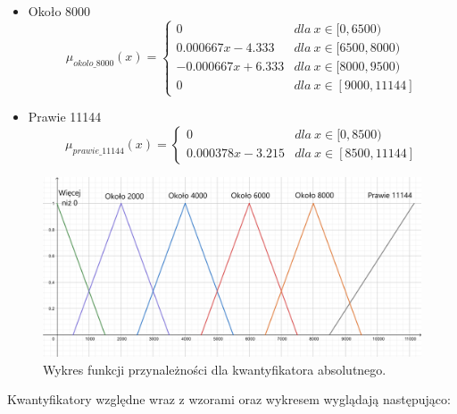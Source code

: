 \documentclass{classrep}
\begin{document}
\begin{itemize}
\begin{equation}
        \end{equation}
        \item Około 8000
        \begin{equation}
            \mu_{okolo\_8000}(x) = \left\{\begin{matrix} 0 & dla \: x\in [0, 6500) \\ 0.000667x - 4.333 & dla \: x\in[6500, 8000) \\ -0.000667x + 6.333 & dla \: x\in [8000, 9500) \\ 0 & dla \: x\in[9000, 11144] \end{matrix}\right.
        \end{equation}
        \item Prawie 11144
        \begin{equation}
            \mu_{prawie\_11144}(x) = \left\{\begin{matrix} 0 & dla \: x\in [0, 8500) \\ 0.000378x - 3.215 & dla \: x\in [8500, 11144] \end{matrix}\right.
        \end{equation}
    \end{itemize}
\begin{figure}[H]
    \centering
    \includegraphics[width=14cm]{wykres_kwantyfikator_absolutny.png}
    \caption{Wykres funkcji przynależności dla kwantyfikatora absolutnego.}
    \label{rysunek:kwantyfikator_absolutny}
\end{figure}
Kwantyfikatory względne wraz z wzorami oraz wykresem wyglądają następująco:
\end{document}
